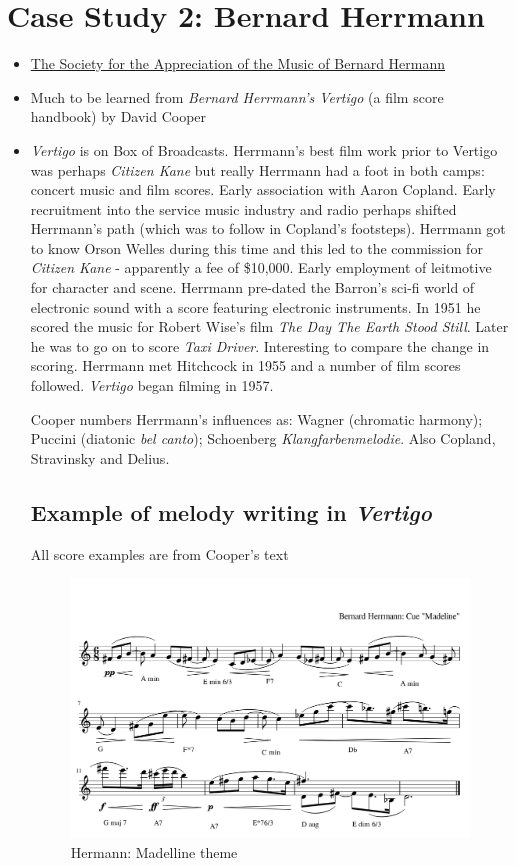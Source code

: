 \section{Case Study 2: Bernard Herrmann}
\begin{itemize}
\item \href{http://www.bernardherrmann.org/}
{The Society for the Appreciation of the Music of Bernard Hermann}
\item Much to be learned from \textit{Bernard Herrmann's Vertigo} (a film score handbook) by David Cooper \citep{cooper2001bernard}
\item \textit{Vertigo} is on Box of Broadcasts. 
Herrmann's best film work prior to Vertigo was perhaps \textit{Citizen Kane} but really Herrmann had a foot in both camps: concert music and film scores.  Early association with Aaron Copland. Early recruitment into the service music industry and radio perhaps shifted Herrmann's path (which was to follow in Copland's footsteps). Herrmann got to know Orson Welles during this time and this led to the commission for \textit{Citizen Kane} - apparently a fee of \$10,000. Early employment of leitmotive for character and scene. Herrmann pre-dated the Barron's sci-fi world of electronic sound with a score featuring electronic instruments. In 1951 he scored the music for Robert Wise's film \textit{The Day The Earth Stood Still}. Later he was to go on to score \textit{Taxi Driver}. Interesting to compare the change in scoring. Herrmann met Hitchcock in 1955 and a number of film scores followed. \textit{Vertigo} began filming in 1957.

Cooper \citeyearpar{cooper2001bernard} numbers Herrmann's influences as: Wagner (chromatic harmony); Puccini (diatonic \textit{bel canto}); Schoenberg \textit{Klangfarbenmelodie}. Also Copland, Stravinsky and Delius. 

\subsection{Example of melody writing in \textit{Vertigo}}

All score examples are from Cooper's text \citeyearpar{cooper2001bernard}

\begin{figure}[H]
\centering
\includegraphics[scale=0.8]{herrmann-madeline}\caption{Hermann: Madelline theme}
\label{fig:Hermann-madeline theme}
\end{figure}


\end{itemize}
